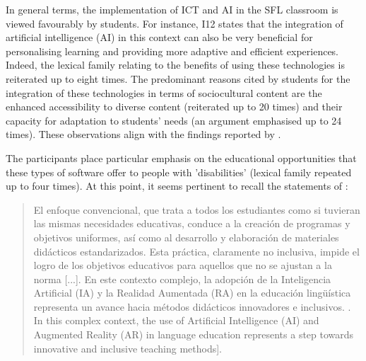 \documentclass[english]{textolivre}
\begin{document}
In general terms, the implementation of ICT and AI in the SFL classroom is viewed favourably by students. For instance, I12 states that the integration of artificial intelligence (AI) in this context can also be very beneficial for personalising learning and providing more adaptive and efficient experiences. Indeed, the lexical family relating to the benefits of using these technologies is reiterated up to eight times. The predominant reasons cited by students for the integration of these technologies in terms of sociocultural content are the enhanced accessibility to diverse content (reiterated up to 20 times) and their capacity for adaptation to students' needs (an argument emphasised up to 24 times). These observations align with the findings reported by \textcite{briceno-nunez2024, munoz-basols2024, intria2023}.

The participants place particular emphasis on the educational opportunities that these types of software offer to people with 'disabilities' (lexical family repeated up to four times). At this point, it seems pertinent to recall the statements of \textcite[p. 57]{clementi2024}:

\begin{quote}
El enfoque convencional, que trata a todos los estudiantes como si tuvieran las mismas necesidades educativas, conduce a la creación de programas y objetivos uniformes, así como al desarrollo y elaboración de materiales didácticos estandarizados. Esta práctica, claramente no inclusiva, impide el logro de los objetivos educativos para aquellos que no se ajustan a la norma [...].
En este contexto complejo, la adopción de la Inteligencia Artificial (IA) y la Realidad Aumentada (RA) en la educación lingüística representa un avance hacia métodos didácticos innovadores e inclusivos.
\newline
[The conventional approach, which treats all students as having the same educational needs, leads to the creation of uniform curricula and objectives, and the development and production of standardised learning materials. This clearly non-inclusive practice prevents the achievement of educational goals for those who do not conform to the norm [...].
In this complex context, the use of Artificial Intelligence (AI) and Augmented Reality (AR) in language education represents a step towards innovative and inclusive teaching methods].
\end{quote}
\end{document}
